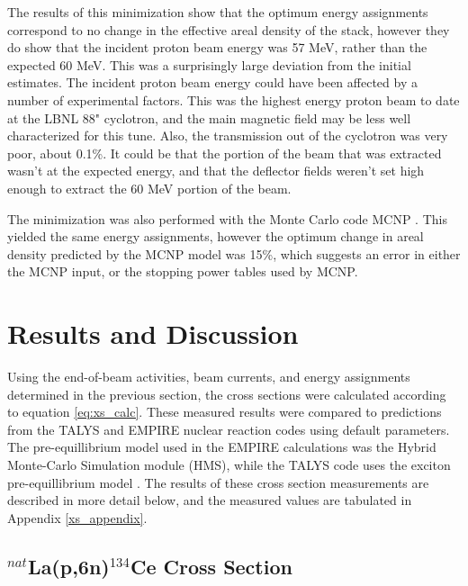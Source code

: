 \documentclass[aps,twocolumn,secnumarabic,balancelastpage,amsmath,amssymb,nofootinbib,floatfix]{revtex4-1}
\begin{document}
The results of this minimization show that the optimum energy assignments correspond to no change in the effective areal density of the stack, however they do show that the incident proton beam energy was 57 MeV, rather than the expected 60 MeV.  This was a surprisingly large deviation from the initial estimates.  The incident proton beam energy could have been affected by a number of experimental factors.  This was the highest energy proton beam to date at the LBNL 88" cyclotron, and the main magnetic field may be less well characterized for this tune.  Also, the transmission out of the cyclotron was very poor, about 0.1\%.  It could be that the portion of the beam that was extracted wasn't at the expected energy, and that the deflector fields weren't set high enough to extract the 60 MeV portion of the beam.


The minimization was also performed with the Monte Carlo code MCNP \cite{MCNP}.  This yielded the same energy assignments, however the optimum change in areal density predicted by the MCNP model was 15\%, which suggests an error in either the MCNP input, or the stopping power tables used by MCNP.

\section{Results and Discussion}

Using the end-of-beam activities, beam currents, and energy assignments determined in the previous section, the cross sections were calculated according to equation \ref{eq:xs_calc}.  These measured results were compared to predictions from the TALYS and EMPIRE nuclear reaction codes using default parameters.  The pre-equillibrium model used in the EMPIRE calculations was the Hybrid Monte-Carlo Simulation module (HMS), while the TALYS code uses the exciton pre-equillibrium model \cite{HERMAN20072655, TALYS}. The results of these cross section measurements are described in more detail below, and the measured values are tabulated in Appendix \ref{xs_appendix}.

\subsection{$^{nat}$La(p,6n)$^{134}$Ce Cross Section}
\end{document}
